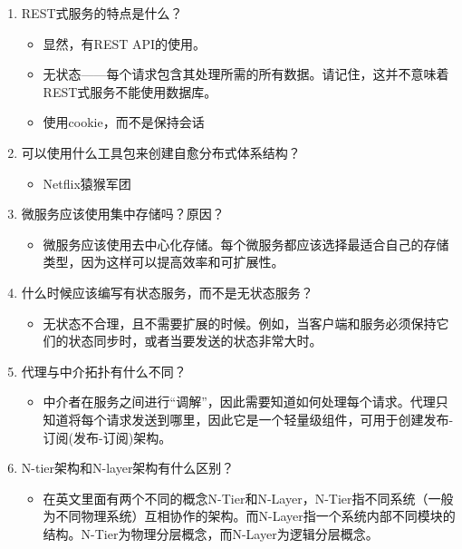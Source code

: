 \begin{enumerate}
\item
REST式服务的特点是什么？

\begin{itemize}
\item 
显然，有REST API的使用。

\item 
无状态——每个请求包含其处理所需的所有数据。请记住，这并不意味着REST式服务不能使用数据库。

\item 
使用cookie，而不是保持会话
\end{itemize}

\item
可以使用什么工具包来创建自愈分布式体系结构？

\begin{itemize}
\item 
Netflix猿猴军团
\end{itemize}

\item
微服务应该使用集中存储吗？原因？

\begin{itemize}
\item 
微服务应该使用去中心化存储。每个微服务都应该选择最适合自己的存储类型，因为这样可以提高效率和可扩展性。
\end{itemize}

\item
什么时候应该编写有状态服务，而不是无状态服务？

\begin{itemize}
\item 
无状态不合理，且不需要扩展的时候。例如，当客户端和服务必须保持它们的状态同步时，或者当要发送的状态非常大时。
\end{itemize}

\item
代理与中介拓扑有什么不同？

\begin{itemize}
\item 
中介者在服务之间进行“调解”，因此需要知道如何处理每个请求。代理只知道将每个请求发送到哪里，因此它是一个轻量级组件，可用于创建发布-订阅(发布-订阅)架构。
\end{itemize}

\item
N-tier架构和N-layer架构有什么区别？

\begin{itemize}
\item 
在英文里面有两个不同的概念N-Tier和N-Layer，N-Tier指不同系统（一般为不同物理系统）互相协作的架构。而N-Layer指一个系统内部不同模块的结构。N-Tier为物理分层概念，而N-Layer为逻辑分层概念。


\end{itemize}
\end{enumerate}

